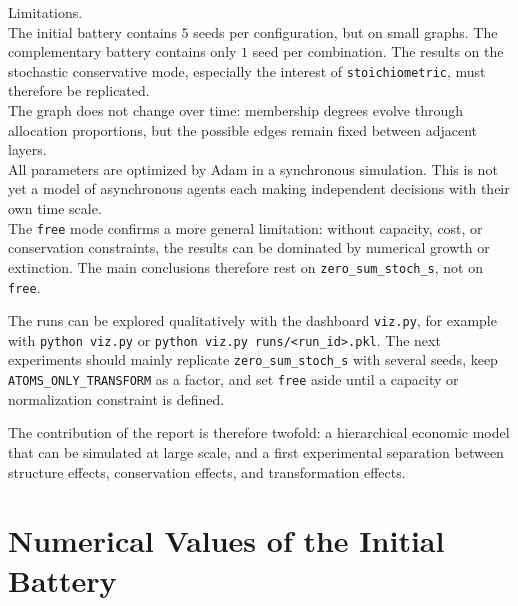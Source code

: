 \documentclass[11pt]{article}
\begin{document}
Limitations.\\
The initial battery contains $5$ seeds per configuration, but on small graphs. The complementary battery contains only $1$ seed per combination. The results on the stochastic conservative mode, especially the interest of \texttt{stoichiometric}, must therefore be replicated.\\
The graph does not change over time: membership degrees evolve through allocation proportions, but the possible edges remain fixed between adjacent layers.\\
All parameters are optimized by Adam in a synchronous simulation. This is not yet a model of asynchronous agents each making independent decisions with their own time scale.\\
The \texttt{free} mode confirms a more general limitation: without capacity, cost, or conservation constraints, the results can be dominated by numerical growth or extinction. The main conclusions therefore rest on \texttt{zero\_sum\_stoch\_s}, not on \texttt{free}.

The runs can be explored qualitatively with the dashboard \texttt{viz.py}, for example with \texttt{python viz.py} or \texttt{python viz.py runs/<run\_id>.pkl}. The next experiments should mainly replicate \texttt{zero\_sum\_stoch\_s} with several seeds, keep \texttt{ATOMS\_ONLY\_TRANSFORM} as a factor, and set \texttt{free} aside until a capacity or normalization constraint is defined.

The contribution of the report is therefore twofold: a hierarchical economic model that can be simulated at large scale, and a first experimental separation between structure effects, conservation effects, and transformation effects.

\appendix

\section{Numerical Values of the Initial Battery}
\end{document}
